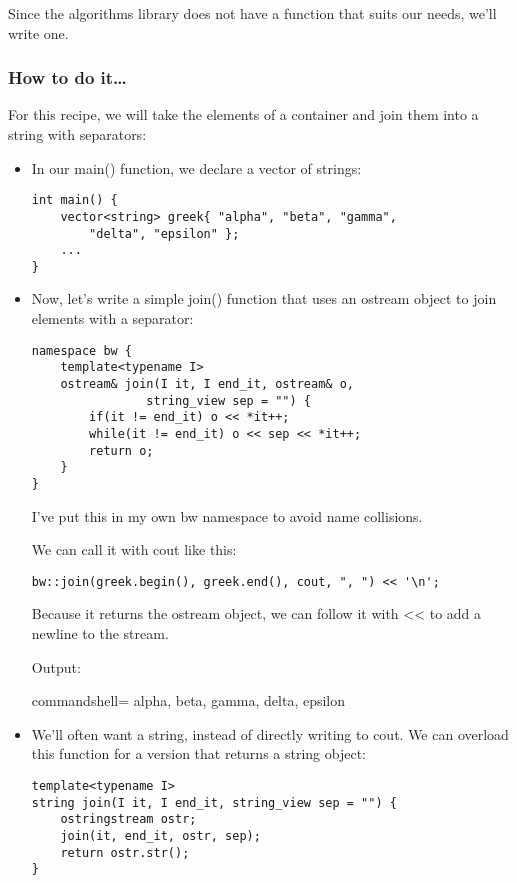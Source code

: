 Since the algorithms library does not have a function that suits our needs, we'll write one.

\subsubsection{How to do it…}

For this recipe, we will take the elements of a container and join them into a string with separators:

\begin{itemize}
\item 
In our main() function, we declare a vector of strings:

\begin{lstlisting}[style=styleCXX]
int main() {
	vector<string> greek{ "alpha", "beta", "gamma",
		"delta", "epsilon" };
	...
}
\end{lstlisting}

\item 
Now, let's write a simple join() function that uses an ostream object to join elements with a separator:

\begin{lstlisting}[style=styleCXX]
namespace bw {
	template<typename I>
	ostream& join(I it, I end_it, ostream& o,
				string_view sep = "") {
		if(it != end_it) o << *it++;
		while(it != end_it) o << sep << *it++;
		return o;
	}
}
\end{lstlisting}

I've put this in my own bw namespace to avoid name collisions.

We can call it with cout like this:

\begin{lstlisting}[style=styleCXX]
bw::join(greek.begin(), greek.end(), cout, ", ") << '\n';
\end{lstlisting}

Because it returns the ostream object, we can follow it with << to add a newline to the stream.

Output:

\begin{tcblisting}{commandshell={}}
alpha, beta, gamma, delta, epsilon
\end{tcblisting}

\item 
We'll often want a string, instead of directly writing to cout. We can overload this function for a version that returns a string object:

\begin{lstlisting}[style=styleCXX]
template<typename I>
string join(I it, I end_it, string_view sep = "") {
	ostringstream ostr;
	join(it, end_it, ostr, sep);
	return ostr.str();
}
\end{lstlisting}


\end{itemize}
